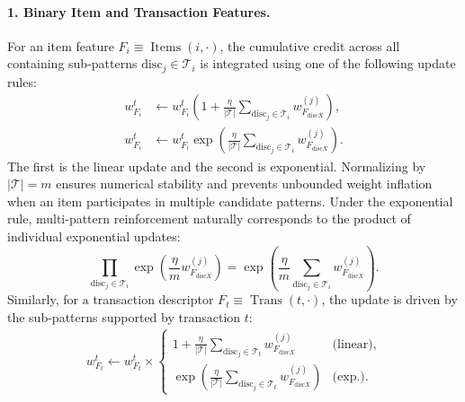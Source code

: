 \documentclass[sigconf]{acmart}
\newcommand{\disc}{\mathrm{disc}}
\begin{document}
\paragraph{1. Binary Item and Transaction Features.}
For an item feature $F_i\equiv\operatorname{Items}(i,\cdot)$, the cumulative credit across all containing sub-patterns $\disc_j\in\mathcal T_i$ is integrated using one of the following update rules:
\begin{align}
 w_{F_i}^{t}&\leftarrow w_{F_i}^{t}\left(1+\frac{\eta}{|\mathcal T|}\sum_{\disc_j\in\mathcal T_i}w_{F_{\disc X}}^{(j)}\right), \label{eq:fine-lin-item}\\
 w_{F_i}^{t}&\leftarrow w_{F_i}^{t}\exp\!\left(\frac{\eta}{|\mathcal T|}\sum_{\disc_j\in\mathcal T_i}w_{F_{\disc X}}^{(j)}\right). \label{eq:fine-exp-item}
\end{align}
The first is the linear update and the second is exponential. Normalizing by $|\mathcal T|=m$ ensures numerical stability and prevents unbounded weight inflation when an item participates in multiple candidate patterns. Under the exponential rule, multi-pattern reinforcement naturally corresponds to the product of individual exponential updates:
\begin{equation}\label{eq:fine-product}
\prod_{\disc_j\in\mathcal T_i}\exp\!\left(\frac{\eta}{m}w_{F_{\disc X}}^{(j)}\right)
=\exp\!\left(\frac{\eta}{m}\sum_{\disc_j\in\mathcal T_i}w_{F_{\disc X}}^{(j)}\right).
\end{equation}
Similarly, for a transaction descriptor $F_t\equiv\operatorname{Trans}(t,\cdot)$, the update is driven by the sub-patterns supported by transaction $t$:
\begin{equation}\label{eq:fine-transaction}
\begin{split}
 w_{F_t}^{t}\leftarrow w_{F_t}^{t}\times\begin{cases}
 1+\frac{\eta}{|\mathcal T|}\sum_{\disc_j\in\mathcal T_t}w_{F_{\disc X}}^{(j)}&\text{(linear)},\\
 \exp\!\left(\frac{\eta}{|\mathcal T|}\sum_{\disc_j\in\mathcal T_t}w_{F_{\disc X}}^{(j)}\right)&\text{(exp.)}.
 \end{cases}
\end{split}
\end{equation}
\end{document}
